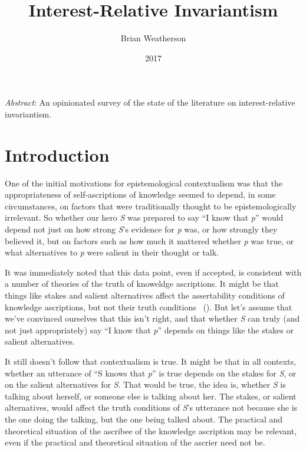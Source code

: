 \documentclass[
  11pt,
  letterpaper,
  DIV=11,
  numbers=noendperiod,
  twoside]{scrartcl}
\title{Interest-Relative Invariantism}
\author{Brian Weatherson}
\date{2017}
\renewenvironment{abstract}
 {\vspace{-1.25cm}
 \quotation\small\noindent\emph{Abstract}:}
 {\endquotation}
\begin{document}
\maketitle
\begin{abstract}
An opinionated survey of the state of the literature on
interest-relative invariantism.
\end{abstract}


\section{Introduction}\label{introduction}

One of the initial motivations for epistemological contextualism was
that the appropriateness of self-ascriptions of knowledge seemed to
depend, in some circumstances, on factors that were traditionally
thought to be epistemologically irrelevant. So whether our hero \emph{S}
was prepared to say ``I know that \emph{p}'' would depend not just on
how strong \emph{S}'s evidence for \emph{p} was, or how strongly they
believed it, but on factors such as how much it mattered whether
\emph{p} was true, or what alternatives to \emph{p} were salient in
their thought or talk.

It was immediately noted that this data point, even if accepted, is
consistent with a number of theories of the truth of knoweldge
ascriptions. It might be that things like stakes and salient
alternatives affect the assertability conditions of knowledge
ascriptions, but not their truth conditions
~(). But let's assume that we've
convinced ourselves that this isn't right, and that whether \emph{S} can
truly (and not just appropriately) say ``I know that \emph{p}'' depends
on things like the stakes or salient alternatives.

It still doesn't follow that contextualism is true. It might be that in
all contexts, whether an utterance of ``S knows that \emph{p}'' is true
depends on the stakes for \emph{S}, or on the salient alternatives for
\emph{S}. That would be true, the idea is, whether \emph{S} is talking
about herself, or someone else is talking about her. The stakes, or
salient alternatives, would affect the truth conditions of \emph{S}'s
utterance not because she is the one doing the talking, but the one
being talked about. The practical and theoretical situation of the
ascribee of the knowledge ascription may be relevant, even if the
practical and theoretical situation of the ascrier need not be.
\end{document}
